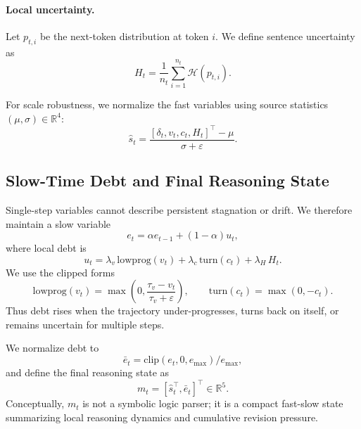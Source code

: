 \documentclass{article}
\newcommand{\R}{\mathbb{R}}
\newcommand{\eps}{\varepsilon}
\begin{document}
\paragraph{Local uncertainty.}
Let $p_{t,i}$ be the next-token distribution at token $i$. We define sentence uncertainty as
\begin{equation}
 H_t = \frac{1}{n_t}\sum_{i=1}^{n_t}\mathcal{H}(p_{t,i}).
\label{eq:Ht2}
\end{equation}

For scale robustness, we normalize the fast variables using source statistics $(\mu,\sigma)\in\R^4$:
\begin{equation}
 \hat s_t = \frac{[\delta_t,v_t,c_t,H_t]^\top-\mu}{\sigma+\eps}.
\label{eq:fastnorm}
\end{equation}

\subsection{Slow-Time Debt and Final Reasoning State}
\label{sec:debt}
Single-step variables cannot describe persistent stagnation or drift. We therefore maintain a slow variable
\begin{equation}
 e_t = \alpha e_{t-1} + (1-\alpha)u_t,
\label{eq:et2}
\end{equation}
where local debt is
\begin{equation}
 u_t = \lambda_v\,\mathrm{lowprog}(v_t) + \lambda_c\,\mathrm{turn}(c_t) + \lambda_H\,H_t.
\label{eq:ut2}
\end{equation}
We use the clipped forms
\begin{equation}
\mathrm{lowprog}(v_t)=\max\!\left(0,\frac{\tau_v-v_t}{\tau_v+\eps}\right), \qquad
\mathrm{turn}(c_t)=\max(0,-c_t).
\label{eq:debtparts2}
\end{equation}
Thus debt rises when the trajectory under-progresses, turns back on itself, or remains uncertain for multiple steps.

We normalize debt to
\begin{equation}
\bar e_t = \mathrm{clip}(e_t,0,e_{\max})/e_{\max},
\label{eq:ebar2}
\end{equation}
and define the final reasoning state as
\begin{equation}
 m_t = [\hat s_t^\top,\bar e_t]^\top \in \R^5.
\label{eq:mt2}
\end{equation}
Conceptually, $m_t$ is not a symbolic logic parser; it is a compact fast-slow state summarizing local reasoning dynamics and cumulative revision pressure.
\end{document}
